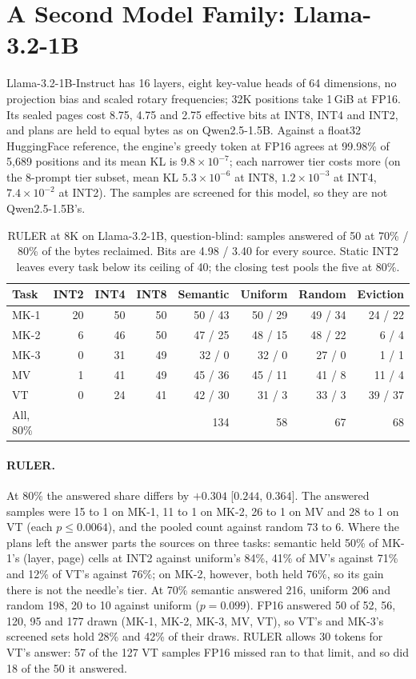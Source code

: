 \documentclass{article}
\begin{document}
\section{A Second Model Family: Llama-3.2-1B}
\label{app:llama}

Llama-3.2-1B-Instruct has 16 layers, eight key-value heads of 64 dimensions, no
projection bias and scaled rotary frequencies; 32K positions take 1\,GiB at FP16.
Its sealed pages cost 8.75, 4.75 and 2.75 effective bits at INT8, INT4 and INT2,
and plans are held to equal bytes as on Qwen2.5-1.5B. Against a float32
HuggingFace reference, the engine's greedy token at FP16 agrees at 99.98\% of
5{,}689 positions and its mean KL is $9.8 \times 10^{-7}$; each narrower tier
costs more (on the 8-prompt tier subset, mean KL $5.3 \times 10^{-6}$ at INT8,
$1.2 \times 10^{-3}$ at INT4, $7.4 \times 10^{-2}$ at INT2). The samples are
screened for this model, so they are not Qwen2.5-1.5B's.

\begin{table}[!ht]
\caption{RULER at 8K on Llama-3.2-1B, question-blind: samples answered of 50 at
70\% / 80\% of the bytes reclaimed. Bits are 4.98 / 3.40 for every source. Static
INT2 leaves every task below its ceiling of 40; the closing test pools the five
at 80\%.}
\label{tab:llama}
\centering
\small
\begin{tabular}{lrrrrrrr}
\toprule
Task & INT2 & INT4 & INT8 & Semantic & Uniform & Random & Eviction \\
\midrule
MK-1 & 20 & 50 & 50 & 50 / 43 & 50 / 29 & 49 / 34 & 24 / 22 \\
MK-2 & 6 & 46 & 50 & 47 / 25 & 48 / 15 & 48 / 22 & 6 / 4 \\
MK-3 & 0 & 31 & 49 & 32 / 0 & 32 / 0 & 27 / 0 & 1 / 1 \\
MV & 1 & 41 & 49 & 45 / 36 & 45 / 11 & 41 / 8 & 11 / 4 \\
VT & 0 & 24 & 41 & 42 / 30 & 31 / 3 & 33 / 3 & 39 / 37 \\
All, 80\% & & & & 134 & 58 & 67 & 68 \\
\bottomrule
\end{tabular}
\end{table}

\paragraph{RULER.} At 80\% the answered share differs by $+0.304$ [$0.244$, $0.364$].
The answered samples were 15 to 1 on MK-1, 11 to 1 on MK-2, 26 to 1 on MV and 28 to 1
on VT (each $p \le 0.0064$), and the pooled count against random 73 to 6. Where the
plans left the answer parts the sources on three tasks: semantic held 50\% of MK-1's (layer, page)
cells at INT2 against uniform's 84\%, 41\% of MV's against 71\% and 12\% of VT's
against 76\%; on MK-2, however, both held 76\%, so its gain there is not the
needle's tier. At 70\% semantic answered 216, uniform 206 and random 198, 20 to 10
against uniform ($p = 0.099$). FP16 answered 50 of 52, 56, 120, 95 and 177 drawn
(MK-1, MK-2, MK-3, MV, VT), so VT's and MK-3's screened sets hold 28\% and 42\% of
their draws. RULER allows 30 tokens for VT's answer: 57 of the 127 VT samples FP16
missed ran to that limit, and so did 18 of the 50 it answered.
\end{document}
